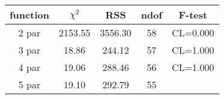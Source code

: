 \begin{tabular}{c|c|c|c|c}
function & $\chi^2$ & RSS & ndof & F-test \\
\hline
2 par & 2153.55 & 3556.30 & 58 & CL=0.000 \\
3 par & 18.86 & 244.12 & 57 & CL=1.000 \\
4 par & 19.06 & 288.46 & 56 & CL=1.000 \\
5 par & 19.10 & 292.79 & 55 & \\
\hline
\end{tabular}